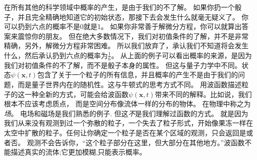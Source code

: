 在所有其他的科学领域中概率的产生，是由于我们的不了解。 如果你扔一个骰子，并且完全精确地知道它的初始状态，那接下去会发生什么就毫无疑义了。 你可以扔到六点的概率不是0就是1。 如果你非常善于解微分方程，你可以就算出答案来震惊你的朋友。 但在绝大多数情况下，我们对初值条件的了解，并不是非常精确，另外，解微分方程非常困难。 所以我们放弃了，承认我们不知道将会发生什么，然后承认扔到六点的概率为$\frac{1}{6}$。 从上面的例子可以看出概率的来源，是因为我们对初值条件的不了解，而不是骰子本身的属性。
但这与量子力学中不同。状态$\psi(\mathbf{x},t)$包含了关于一个粒子的所有信息，并且概率的产生不是由于我们的问题，而是量子世界内在的随机性。这与牛顿式的思考方式不同。
用波函数描述粒子的这一种全新的方式，可能会给波函数$\psi(\mathbf{x},t)$带来不同的解释。比如说，我们根本不应该考虑质点， 而是空间分布像流体一样的分布的物体。 在物理中称之为\textit{场}。 电场和磁场是我们熟悉的例子. 但这\textit{不}是我们理解过函数的方式。 就是因为我们从来没有观测到过一个弥散的粒子，一个失去了粒子形式，开始像果冻一样在太空中扩散的粒子。任何让你确定一个粒子是否在某个区域的观测，只会返回是或者否。 观测不会告诉你，“这个粒子部分在这里，但大部分在其他地方。”波函数不能描述真实的流体;它更加模糊,只能表示概率。
